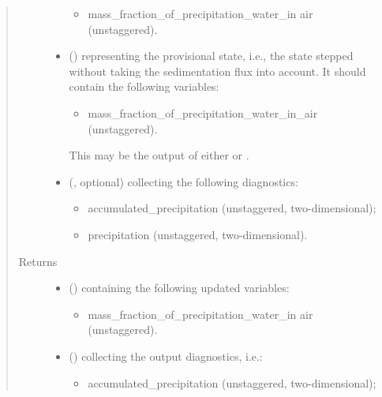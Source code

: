 \documentclass[letterpaper,10pt,english]{sphinxmanual}
\begin{document}
\begin{fulllineitems}
\begin{fulllineitems}
\begin{quote}
\begin{description}
\begin{itemize}
\begin{itemize}
\item {} 
mass\_fraction\_of\_precipitation\_water\_in air (unstaggered).

\end{itemize}


\item {} 
 () \textendash{} 
 representing the provisional state, i.e.,
the state stepped without taking the sedimentation flux into account.
It should contain the following variables:
\begin{itemize}
\item {} 
mass\_fraction\_of\_precipitation\_water\_in\_air (unstaggered).

\end{itemize}

This may be the output of either
 or
.


\item {} 
 (, optional) \textendash{} 
 collecting the following diagnostics:
\begin{itemize}
\item {} 
accumulated\_precipitation (unstaggered, two-dimensional);

\item {} 
precipitation (unstaggered, two-dimensional).

\end{itemize}


\end{itemize}

\item[{Returns}] \leavevmode
\begin{itemize}
\item {} 
 () \textendash{}  containing the following updated variables:
\begin{itemize}
\item {} 
mass\_fraction\_of\_precipitation\_water\_in air (unstaggered).

\end{itemize}

\item {} 
 () \textendash{}  collecting the output diagnostics, i.e.:
\begin{itemize}
\item {} 
accumulated\_precipitation (unstaggered, two-dimensional);


\end{itemize}
\end{itemize}
\end{description}
\end{quote}
\end{fulllineitems}
\end{fulllineitems}
\end{document}
